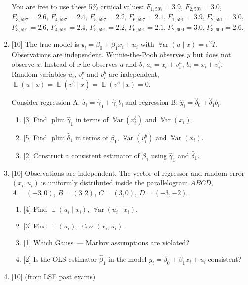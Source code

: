 \documentclass[12pt]{article}
\DeclareMathOperator{\Cov}{\mathbb{C}ov}
\DeclareMathOperator{\Var}{\mathbb{V}ar}
\DeclareMathOperator{\E}{\mathbb{E}}
\DeclareMathOperator{\plim}{plim}
\begin{document}
\begin{enumerate}
You are free to use these 5\% critical values: $F_{1, 597} =3.9$,  $F_{2, 597}=3.0$, $F_{3, 597}=2.6$, $F_{4, 597}=2.4$, $F_{5, 597}=2.2$, $F_{6, 597}=2.1$,
$F_{1, 591} =3.9$,  $F_{2, 591}=3.0$, $F_{3, 591}=2.6$, $F_{4, 591}=2.4$, $F_{5, 591}=2.2$, $F_{6, 591}=2.1$, $F_{2,600} = 3.0$, $F_{3, 600} = 2.6$.

    
\newpage
    \item {[10]} The true model is $y_i = \beta_0 + \beta_1 x_i + u_i$ with $\Var(u \mid x) = \sigma^2 I$. 
    Observations are independent.
    Winnie-the-Pooh observes $y$ but does not observe $x$.
    Instead of $x$ he observes $a$ and $b$, $a_i = x_i + v^a_i$, $b_i = x_i + v^b_i$. 
    Random variables $u_i$, $v^a_i$ and $v^b_i$ are independent, $\E(u \mid x) = \E(v^b \mid x) = \E(v^a \mid x) = 0$.


    Consider regression A: $\hat a_i = \hat \gamma_0 + \hat \gamma_1 b_i$ and regression B: $\hat y_i = \hat \delta_0 + \hat \delta_1 b_i$.

    \begin{enumerate}
        \item {[3]} Find $\plim \hat\gamma_1$ in terms of $\Var(v^b_i)$ and $\Var(x_i)$.
        \item {[5]} Find $\plim \hat\delta_1$ in terms of $\beta_1$, $\Var(v^b_i)$ and $\Var(x_i)$.
        \item {[2]} Construct a consistent estimator of $\beta_1$ using $\hat\gamma_1$ and $\hat\delta_1$. 
    \end{enumerate}


    \item {[10]} Observations are independent. 
    The vector of regressor and random error $(x_i, u_i)$ is uniformly distributed inside the parallelogram $ABCD$,
    $A = (-3, 0)$, $B = (3, 2)$, $C = (3, 0)$, $D = (-3, -2)$.
        
    \begin{enumerate}
        \item {[4]} Find $\E(u_i \mid x_i)$, $\Var(u_i \mid x_i)$.
        \item {[3]} Find $\E(u_i)$, $\Cov(x_i, u_i)$.
        \item {[1]} Which Gauss~— Markov assumptions are violated?
        \item {[2]} Is the OLS estimator $\hat \beta_1$ in the model $y_i = \beta_0 + \beta_1 x_i + u_i$ consistent?
    \end{enumerate}



    \item {[10]} (from LSE past exams) 
    

\end{enumerate}
\end{document}
